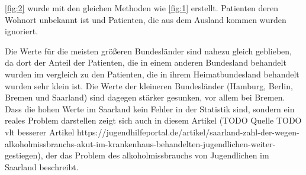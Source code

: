\documentclass{article}
\begin{document}
\ref{fig:2} wurde mit den gleichen Methoden wie \ref{fig:1} erstellt. Patienten deren Wohnort unbekannt ist und Patienten, die aus dem Ausland kommen wurden ignoriert. 

Die Werte für die meisten größeren Bundesländer sind nahezu gleich geblieben, da dort der Anteil der Patienten, die in einem anderen Bundesland behandelt wurden im vergleich zu den Patienten, die in ihrem Heimatbundesland behandelt wurden sehr klein ist. Die Werte der kleineren Bundesländer (Hamburg, Berlin, Bremen und Saarland) sind dagegen stärker gesunken, vor allem bei Bremen. Dass die hohen Werte im Saarland kein Fehler in der Statistik sind, sondern ein reales Problem darstellen zeigt sich auch in diesem Artikel (TODO Quelle TODO vlt besserer Artikel https://jugendhilfeportal.de/artikel/saarland-zahl-der-wegen-alkoholmissbrauchs-akut-im-krankenhaus-behandelten-jugendlichen-weiter-gestiegen), der das Problem des alkoholmissbrauchs von Jugendlichen im Saarland beschreibt. 
\end{document}
